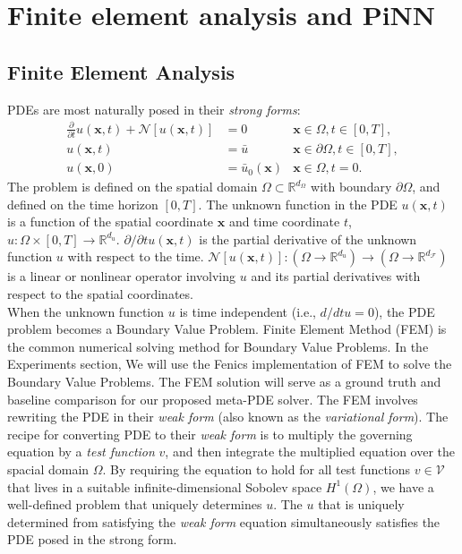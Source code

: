 \section{Finite element analysis and PiNN}
\subsection{Finite Element Analysis}
\label{sec:metapde-fea}
PDEs are most naturally posed in their \emph{strong forms}:
\begin{align}
\frac{\partial}{\partial t}u(\bm{x}, t) + \mathcal{N}\left[ u(\bm{x}, t)\right] &= 0 &\bm{x} \in \Omega, t \in [0, T], \label{eq:metapde-strongform} \\
u(\bm{x}, t) &= \bar{u} & \bm{x} \in \partial\Omega, t \in [0, T], \label{eq:metapde-bc} \\
u(\bm{x}, 0) &= \bar{u}_0(\bm{x}) &\bm{x} \in \Omega, t=0. \label{eq:metapde-ic} 
\end{align}
The problem is defined on the spatial domain $\Omega \subset \mathbb{R}^{d_\Omega}$ with boundary $\partial \Omega$, and defined on the time horizon $[0, T]$. The unknown function in the PDE $u(\bm{x}, t)$ is a function of the spatial coordinate $\bm{x}$ and time coordinate $t$, $u: \Omega \times [0, T] \to \mathbb{R}^{d_u}$. $\partial / \partial t u(\bm{x}, t) $ is the partial derivative of the unknown function $u$ with respect to the time. $\mathcal{N}\left[ u(\bm{x}, t)\right]: (\Omega \to \mathbb{R}^{d_u}) \to (\Omega \to \mathbb{R}^{d_\mathcal{F}})$ is a linear or nonlinear operator involving $u$ and its partial derivatives with respect to the spatial coordinates.\\
When the unknown function $u$ is time independent (i.e., $d/ dt u = 0$), the PDE problem becomes a Boundary Value Problem. Finite Element Method (FEM) is the common numerical solving method for Boundary Value Problems. In the Experiments section, We will use the Fenics \citep{alnaes2015fenics} implementation of FEM to solve the Boundary Value Problems. The FEM solution will serve as a ground truth and baseline comparison for our proposed meta-PDE solver. The FEM involves rewriting the PDE in their \emph{weak form} (also known as the \emph{variational form}). The recipe for converting PDE to their \emph{weak form} is to multiply the governing equation by a \emph{test function} $v$, and then integrate the multiplied equation over the spacial domain $\Omega$. By requiring the equation to hold for all test functions $v \in \mathcal{V}$ that lives in a suitable infinite-dimensional Sobolev space $H^1(\Omega)$, we have a well-defined problem that uniquely determines $u$. The $u$ that is uniquely determined from satisfying the \emph{weak form} equation simultaneously satisfies the PDE posed in the strong form.
